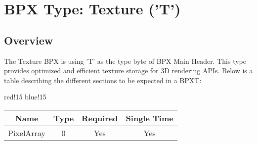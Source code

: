 \section{BPX Type: Texture ('T')}

\subsection{Overview}
The Texture BPX is using 'T' as the type byte of BPX Main Header. This type provides optimized and efficient texture storage for 3D rendering APIs.
\newline
Below is a table describing the different sections to be expected in a BPXT:
\begin{center}
    {
        {red!15}
        {blue!15}
        \begin{tabular}{|c|c|c|c|}
            \hline
            \textbf{Name} & \textbf{Type} & \textbf{Required} & \textbf{Single Time} \\

            \hline\hline
            PixelArray & 0 & Yes & Yes \\
            \hline
        \end{tabular}
    }
\end{center}

